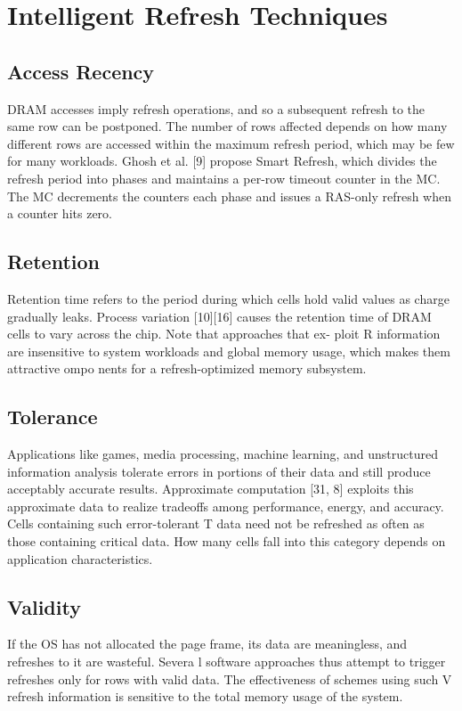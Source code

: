 \section{Intelligent Refresh Techniques} 
\label{sec:int}

\subsection{Access Recency}
DRAM accesses imply refresh operations, and so a subsequent refresh to the same row can be postponed. The number of rows affected depends on how many different rows are accessed within the maximum refresh period, which may be few for many workloads. Ghosh et al. [9] propose Smart Refresh, which divides the refresh period into phases and maintains a per-row timeout counter in the MC. The MC decrements the counters each phase and issues a RAS-only refresh when a counter hits zero.


\subsection{Retention}
Retention time refers to the period during which cells hold valid values as charge gradually leaks. Process variation [10][16] causes the retention time of DRAM cells to vary across the chip. Note that approaches that ex-
ploit R information are insensitive to system workloads and global memory usage, which makes them attractive ompo
nents for a refresh-optimized memory subsystem.

\subsection{Tolerance}
Applications like games, media processing, machine learning, and unstructured information analysis tolerate errors in portions of their data and still produce acceptably accurate results. Approximate computation [31, 8] exploits this approximate data to realize tradeoffs among performance, energy, and accuracy. Cells containing such error-tolerant T data need not be refreshed as often as those containing critical data. How many cells fall into this category depends on application characteristics.

\subsection{Validity}
If the OS has not allocated the page frame, its data are meaningless, and refreshes to it are wasteful. Severa
l software approaches thus attempt to trigger refreshes only for rows with valid data. The effectiveness of schemes using such V refresh information is sensitive to the total memory usage of the system.